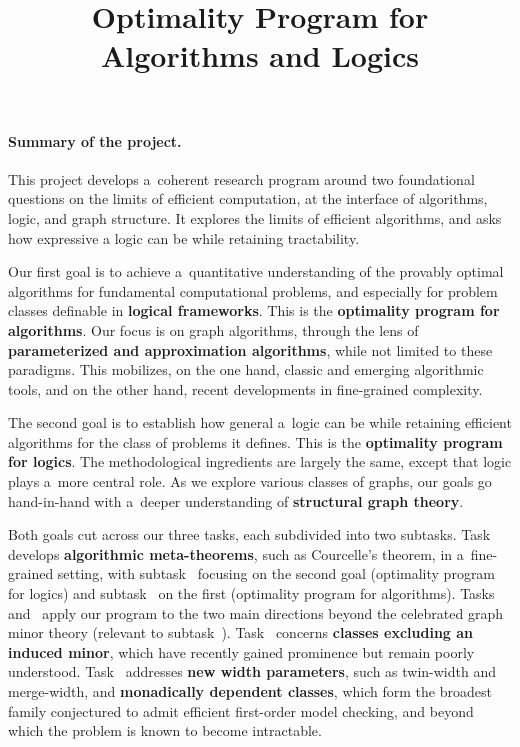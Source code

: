 \documentclass[a4paper,11pt]{article}
\title{Optimality Program for Algorithms and Logics}
\author{}
\date{}
\begin{document}
\maketitle
\thispagestyle{fancy}

\vspace{-2.5cm}

\paragraph{Summary of the project.} 
This project develops a~coherent research program around two foundational questions on the limits of efficient computation, at the interface of algorithms, logic, and graph structure.
It explores the limits of efficient algorithms, and asks how expressive a logic can be while retaining tractability.

Our first goal is to achieve a~quantitative understanding of the provably optimal algorithms for fundamental computational problems, and especially for problem classes definable in \textbf{logical frameworks}.
This is the \textbf{optimality program for algorithms}.
Our focus is on graph algorithms, through the lens of \textbf{parameterized and approximation algorithms}, while not limited to these paradigms.
This mobilizes, on the one hand, classic and emerging algorithmic tools, and on the other hand, recent developments in fine-grained complexity.  

The second goal is to establish how general a~logic can be while retaining efficient algorithms for the class of problems it defines. 
This is the \textbf{optimality program for logics}.
The methodological ingredients are largely the same, except that logic plays a~more central role.   
As we explore various classes of graphs, our goals go hand-in-hand with a~deeper understanding of \textbf{structural graph theory}.

Both goals cut across our three tasks, each subdivided into two subtasks.
Task~ develops \textbf{algorithmic meta-theorems}, such as Courcelle's theorem, in a~fine-grained setting, with subtask~ focusing on the second goal (optimality program for logics) and subtask~ on the first (optimality program for algorithms).
Tasks~ and~ apply our program to the two main directions beyond the celebrated graph minor theory (relevant to subtask~).
Task~ concerns \textbf{classes excluding an induced minor}, which have recently gained prominence but remain poorly understood.
Task~ addresses \textbf{new width parameters}, such as twin-width and merge-width, and \textbf{monadically dependent classes}, which form the broadest family conjectured to admit efficient first-order model checking, and beyond which the problem is known to become intractable.
\end{document}
